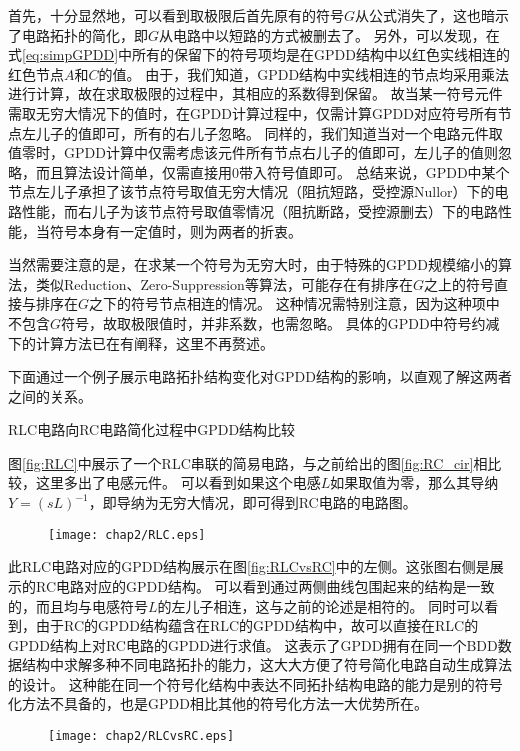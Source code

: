首先，十分显然地，可以看到取极限后首先原有的符号$G$从公式消失了，这也暗示了电路拓扑的简化，即$G$从电路中以短路的方式被删去了。
另外，可以发现，在式\ref{eq:simpGPDD}中所有的保留下的符号项均是在GPDD结构中以红色实线相连的红色节点$A$和$C$的值。
由于，我们知道，GPDD结构中实线相连的节点均采用乘法进行计算，故在求取极限的过程中，其相应的系数得到保留。
故当某一符号元件需取无穷大情况下的值时，在GPDD计算过程中，仅需计算GPDD对应符号所有节点左儿子的值即可，所有的右儿子忽略。
同样的，我们知道当对一个电路元件取值零时，GPDD计算中仅需考虑该元件所有节点右儿子的值即可，左儿子的值则忽略，而且算法设计简单，仅需直接用0带入符号值即可。
总结来说，GPDD中某个节点左儿子承担了该节点符号取值无穷大情况（阻抗短路，受控源Nullor）下的电路性能，而右儿子为该节点符号取值零情况（阻抗断路，受控源删去）下的电路性能，当符号本身有一定值时，则为两者的折衷。

当然需要注意的是，在求某一个符号为无穷大时，由于特殊的GPDD规模缩小的算法，类似Reduction、Zero-Suppression等算法\parencite{GShi-GPDD-2013,GShi-GPDD}，可能存在有排序在$G$之上的符号直接与排序在$G$之下的符号节点相连的情况。
这种情况需特别注意，因为这种项中不包含$G$符号，故取极限值时，并非系数，也需忽略。
具体的GPDD中符号约减下的计算方法已在\parencite{HanbinHu-Thesis}有阐释，这里不再赘述。

下面通过一个例子展示电路拓扑结构变化对GPDD结构的影响，以直观了解这两者之间的关系。

\begin{exmp}
	RLC电路向RC电路简化过程中GPDD结构比较
	
	图\ref{fig:RLC}中展示了一个RLC串联的简易电路，与之前给出的图\ref{fig:RC_cir}相比较，这里多出了电感元件。
	可以看到如果这个电感$L$如果取值为零，那么其导纳$Y=\left(s L\right)^{-1}$，即导纳为无穷大情况，即可得到RC电路的电路图。
	
	\begin{figure}[!htp]
		\centering
		\texttt{[image: chap2/RLC.eps]}
	\end{figure}
	
	此RLC电路对应的GPDD结构展示在图\ref{fig:RLCvsRC}中的左侧。这张图右侧是展示的RC电路对应的GPDD结构。
	可以看到通过两侧曲线包围起来的结构是一致的，而且均与电感符号$L$的左儿子相连，这与之前的论述是相符的。
	同时可以看到，由于RC的GPDD结构蕴含在RLC的GPDD结构中，故可以直接在RLC的GPDD结构上对RC电路的GPDD进行求值。
	这表示了GPDD拥有在同一个BDD数据结构中求解多种不同电路拓扑的能力，这大大方便了符号简化电路自动生成算法的设计。
	这种能在同一个符号化结构中表达不同拓扑结构电路的能力是别的符号化方法不具备的，也是GPDD相比其他的符号化方法一大优势所在。
	
	\begin{figure}[!htp]
		\centering
		\texttt{[image: chap2/RLCvsRC.eps]}
	\end{figure}
	
\end{exmp}

